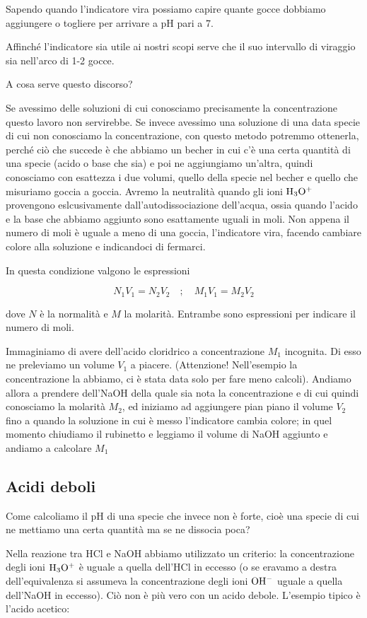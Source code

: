 Sapendo quando l'indicatore vira possiamo capire quante gocce dobbiamo aggiungere o togliere per arrivare a pH pari a 7.

Affinché l'indicatore sia utile ai nostri scopi serve che il suo intervallo di viraggio sia nell'arco di 1-2 gocce.

A cosa serve questo discorso?

Se avessimo delle soluzioni di cui conosciamo precisamente la concentrazione questo lavoro non servirebbe. Se invece avessimo una soluzione di una data specie di cui non conosciamo la concentrazione, con questo metodo potremmo ottenerla, perché ciò che succede è che abbiamo un becher in cui c'è una certa quantità di una specie (acido o base che sia) e poi ne aggiungiamo un'altra, quindi conosciamo con esattezza i due volumi, quello della specie nel becher e quello che misuriamo goccia a goccia. Avremo la neutralità quando gli ioni $\rm H_3O^+$ provengono eslcusivamente dall'autodissociazione dell'acqua, ossia quando l'acido e la base che abbiamo aggiunto sono esattamente uguali in moli. Non appena il numero di moli è uguale a meno di una goccia, l'indicatore vira, facendo cambiare colore alla soluzione e indicandoci di fermarci.

In questa condizione valgono le espressioni

$$N_1V_1=N_2V_2
\quad
;
\quad
M_1V_1=M_2V_2$$

dove $N$ è la normalità e $M$ la molarità. Entrambe sono espressioni per indicare il numero di moli.

Immaginiamo di avere dell'acido cloridrico a concentrazione $M_1$ incognita. Di esso ne preleviamo un volume $V_1$ a piacere. (Attenzione! Nell'esempio la concentrazione la abbiamo, ci è stata data solo per fare meno calcoli). Andiamo allora a prendere dell'NaOH della quale sia nota la concentrazione e di cui quindi conosciamo la molarità $M_2$, ed iniziamo ad aggiungere pian piano il volume $V_2$ fino a quando la soluzione in cui è messo l'indicatore cambia colore; in quel momento chiudiamo il rubinetto e leggiamo il volume di NaOH aggiunto e andiamo a calcolare $M_1$
\subsection{Acidi deboli}
Come calcoliamo il pH di una specie che invece non è forte, cioè una specie di cui ne mettiamo una certa quantità ma se ne dissocia poca?

Nella reazione tra HCl e NaOH abbiamo utilizzato un criterio: la concentrazione degli ioni $\rm H_3O^+$ è uguale a quella dell'HCl in eccesso (o se eravamo a destra dell'equivalenza si assumeva la concentrazione degli ioni $\rm OH^-$ uguale a quella dell'NaOH in eccesso). Ciò non è più vero con un acido debole. L'esempio tipico è l'acido acetico:

